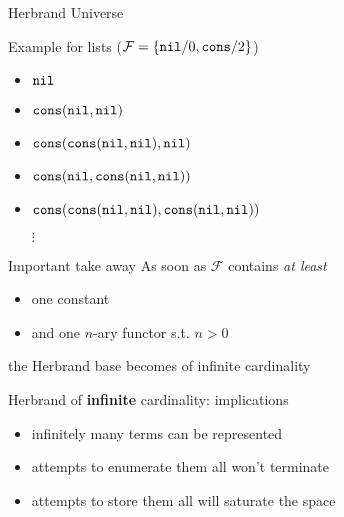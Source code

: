 \documentclass[presentation]{beamer}\mode<presentation>{\usetheme{AMSBolognaFC}}
\begin{document}
\begin{frame}[allowframebreaks]{Herbrand Universe}
    \begin{exampleblock}{Example for lists ($\mathcal{F} = \{ \mathtt{nil}/0, \mathtt{cons}/2 \}$)}
        \begin{itemize}
            \item $\mathtt{nil}$
            \item $\mathtt{cons}(\mathtt{nil}, \mathtt{nil})$
            \item $\mathtt{cons}(\mathtt{cons}(\mathtt{nil}, \mathtt{nil}), \mathtt{nil})$
            \item $\mathtt{cons}(\mathtt{nil}, \mathtt{cons}(\mathtt{nil}, \mathtt{nil}))$
            \item $\mathtt{cons}(\mathtt{cons}(\mathtt{nil}, \mathtt{nil}), \mathtt{cons}(\mathtt{nil}, \mathtt{nil}))$
            \item[$\vdots$]
        \end{itemize}
    \end{exampleblock}

    \begin{alertblock}{Important take away}
        As soon as $\mathcal{F}$ contains \emph{at least}
        \begin{itemize}
            \item one constant
            \item and one $n$-ary functor s.t. $n>0$
        \end{itemize}
        the Herbrand base becomes of \alert{infinite} cardinality
    \end{alertblock}

    \begin{block}{Herbrand of \textbf{infinite} cardinality: implications}
        \begin{itemize}
            \item infinitely many terms can be represented
            \item attempts to enumerate them all won't terminate
            \item attempts to store them all will saturate the space
        \end{itemize}
    \end{block}
\end{frame}

\begin{frame}

\end{frame}
\end{document}

